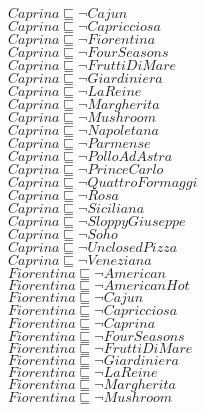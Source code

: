 \documentclass[a4paper,10pt]{article}
\begin{document}
 $Caprina \sqsubseteq  \lnot Cajun$\\ 
 $Caprina \sqsubseteq  \lnot Capricciosa$\\ 
 $Caprina \sqsubseteq  \lnot Fiorentina$\\ 
 $Caprina \sqsubseteq  \lnot FourSeasons$\\ 
 $Caprina \sqsubseteq  \lnot FruttiDiMare$\\ 
 $Caprina \sqsubseteq  \lnot Giardiniera$\\ 
 $Caprina \sqsubseteq  \lnot LaReine$\\ 
 $Caprina \sqsubseteq  \lnot Margherita$\\ 
 $Caprina \sqsubseteq  \lnot Mushroom$\\ 
 $Caprina \sqsubseteq  \lnot Napoletana$\\ 
 $Caprina \sqsubseteq  \lnot Parmense$\\ 
 $Caprina \sqsubseteq  \lnot PolloAdAstra$\\ 
 $Caprina \sqsubseteq  \lnot PrinceCarlo$\\ 
 $Caprina \sqsubseteq  \lnot QuattroFormaggi$\\ 
 $Caprina \sqsubseteq  \lnot Rosa$\\ 
 $Caprina \sqsubseteq  \lnot Siciliana$\\ 
 $Caprina \sqsubseteq  \lnot SloppyGiuseppe$\\ 
 $Caprina \sqsubseteq  \lnot Soho$\\ 
 $Caprina \sqsubseteq  \lnot UnclosedPizza$\\ 
 $Caprina \sqsubseteq  \lnot Veneziana$\\ 
 $Fiorentina \sqsubseteq  \lnot American$\\ 
 $Fiorentina \sqsubseteq  \lnot AmericanHot$\\ 
 $Fiorentina \sqsubseteq  \lnot Cajun$\\ 
 $Fiorentina \sqsubseteq  \lnot Capricciosa$\\ 
 $Fiorentina \sqsubseteq  \lnot Caprina$\\ 
 $Fiorentina \sqsubseteq  \lnot FourSeasons$\\ 
 $Fiorentina \sqsubseteq  \lnot FruttiDiMare$\\ 
 $Fiorentina \sqsubseteq  \lnot Giardiniera$\\ 
 $Fiorentina \sqsubseteq  \lnot LaReine$\\ 
 $Fiorentina \sqsubseteq  \lnot Margherita$\\ 
 $Fiorentina \sqsubseteq  \lnot Mushroom$\\ 
\end{document}
